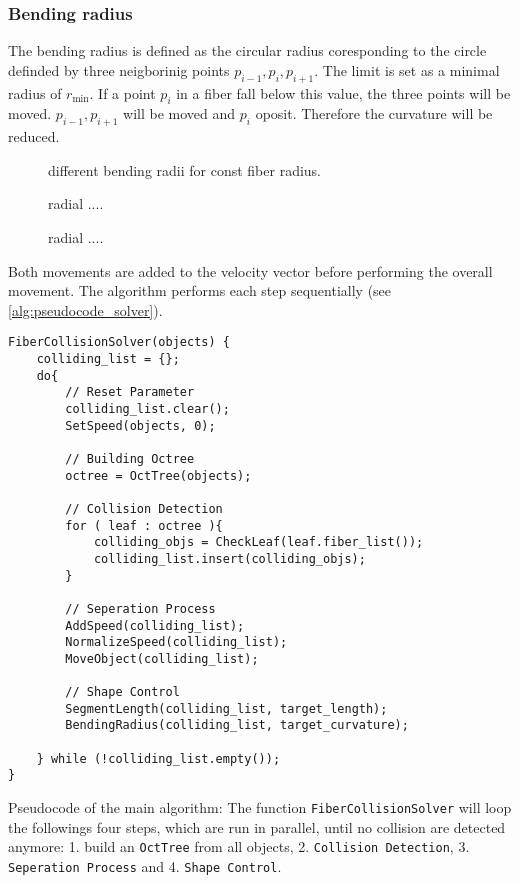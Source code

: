 \subsubsection{Bending radius}
% 
The bending radius is defined as the circular radius coresponding to the circle definded by three neigborinig points $p_{i-1}, p_{i}, p_{i+1}$. 
The limit is set as a minimal radius of $r_{\min}$. If a point $p_{i}$ in a fiber fall below this value, the three points will be moved.
$p_{i-1},p_{i+1}$ will be moved \dummy and $p_{i}$ oposit.
Therefore the curvature will be reduced.
% 
\begin{figure}[!tb]
    \centering
	\caption{different bending radii for const fiber radius.}
	\label{fig:model_radius}
\end{figure}
% 
\begin{figure}[!tb]
    \centering
	\caption{radial ....}
	\label{fig:model_circular}
\end{figure}
% 
\begin{figure}[!tb]
    \centering
	\caption{radial ....}
	\label{fig:model_circle_}
\end{figure}
% 
\newline
Both movements are added to the velocity vector before performing the overall movement.
The algorithm performs each step sequentially (see \cref{alg:pseudocode_solver}).
\begin{lstfloat}[!tb]
\lstset{style=cpp}

\begin{lstlisting}[]
FiberCollisionSolver(objects) {
	colliding_list = {};
	do{
		// Reset Parameter
		colliding_list.clear();
		SetSpeed(objects, 0);
		
		// Building Octree
		octree = OctTree(objects);
		
		// Collision Detection
		for ( leaf : octree ){
			colliding_objs = CheckLeaf(leaf.fiber_list());
			colliding_list.insert(colliding_objs);
		}
		
		// Seperation Process
		AddSpeed(colliding_list);
		NormalizeSpeed(colliding_list);
		MoveObject(colliding_list);
		
		// Shape Control
		SegmentLength(colliding_list, target_length);
		BendingRadius(colliding_list, target_curvature);
		
	} while (!colliding_list.empty());
}
\end{lstlisting}
\caption{Pseudocode of the main algorithm: The function \texttt{FiberCollisionSolver} will loop the followings four steps, which are run in parallel, until no collision are detected anymore: 1. build an \texttt{OctTree} from all objects, 2. \texttt{Collision Detection}, 3. \texttt{Seperation Process} and 4. \texttt{Shape Control}.}
\label{alg:pseudocode_solver}
\end{lstfloat}
